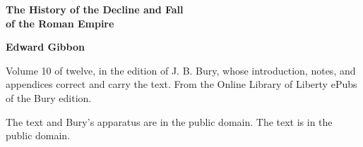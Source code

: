 \documentclass[11pt,letterpaper]{article}
\begin{document}
\color{ink}

\begin{titlepage}
\centering
\vspace*{4em}
{\LARGE\bfseries\color{heading} The History of the Decline and Fall\\[0.3em]of the Roman Empire\par}
\vspace{2em}
{\Large\bfseries\color{heading} Edward Gibbon\par}
\vspace{2.5em}
{\itshape\color{subhead}\parbox{0.8\linewidth}{\centering Volume 10 of twelve, in the edition of J. B. Bury, whose introduction, notes, and appendices correct and carry the text. From the Online Library of Liberty ePubs of the Bury edition.\par}}
\vfill
{\small The text and Bury's apparatus are in the public domain. The text is in the public domain.\par}
\vspace{2em}
\end{titlepage}

\tableofcontents


\end{document}
